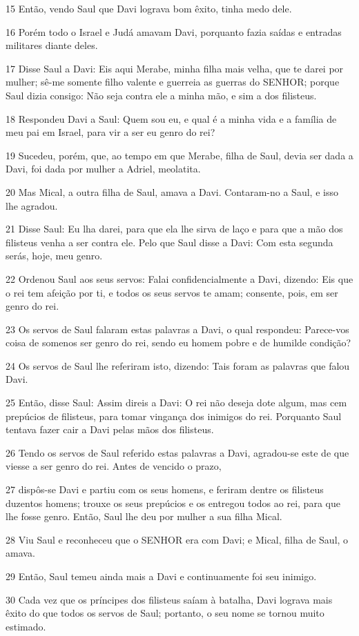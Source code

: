 \par 15 Então, vendo Saul que Davi lograva bom êxito, tinha medo dele.
\par 16 Porém todo o Israel e Judá amavam Davi, porquanto fazia saídas e entradas militares diante deles.
\par 17 Disse Saul a Davi: Eis aqui Merabe, minha filha mais velha, que te darei por mulher; sê-me somente filho valente e guerreia as guerras do SENHOR; porque Saul dizia consigo: Não seja contra ele a minha mão, e sim a dos filisteus.
\par 18 Respondeu Davi a Saul: Quem sou eu, e qual é a minha vida e a família de meu pai em Israel, para vir a ser eu genro do rei?
\par 19 Sucedeu, porém, que, ao tempo em que Merabe, filha de Saul, devia ser dada a Davi, foi dada por mulher a Adriel, meolatita.
\par 20 Mas Mical, a outra filha de Saul, amava a Davi. Contaram-no a Saul, e isso lhe agradou.
\par 21 Disse Saul: Eu lha darei, para que ela lhe sirva de laço e para que a mão dos filisteus venha a ser contra ele. Pelo que Saul disse a Davi: Com esta segunda serás, hoje, meu genro.
\par 22 Ordenou Saul aos seus servos: Falai confidencialmente a Davi, dizendo: Eis que o rei tem afeição por ti, e todos os seus servos te amam; consente, pois, em ser genro do rei.
\par 23 Os servos de Saul falaram estas palavras a Davi, o qual respondeu: Parece-vos coisa de somenos ser genro do rei, sendo eu homem pobre e de humilde condição?
\par 24 Os servos de Saul lhe referiram isto, dizendo: Tais foram as palavras que falou Davi.
\par 25 Então, disse Saul: Assim direis a Davi: O rei não deseja dote algum, mas cem prepúcios de filisteus, para tomar vingança dos inimigos do rei. Porquanto Saul tentava fazer cair a Davi pelas mãos dos filisteus.
\par 26 Tendo os servos de Saul referido estas palavras a Davi, agradou-se este de que viesse a ser genro do rei. Antes de vencido o prazo,
\par 27 dispôs-se Davi e partiu com os seus homens, e feriram dentre os filisteus duzentos homens; trouxe os seus prepúcios e os entregou todos ao rei, para que lhe fosse genro. Então, Saul lhe deu por mulher a sua filha Mical.
\par 28 Viu Saul e reconheceu que o SENHOR era com Davi; e Mical, filha de Saul, o amava.
\par 29 Então, Saul temeu ainda mais a Davi e continuamente foi seu inimigo.
\par 30 Cada vez que os príncipes dos filisteus saíam à batalha, Davi lograva mais êxito do que todos os servos de Saul; portanto, o seu nome se tornou muito estimado.


